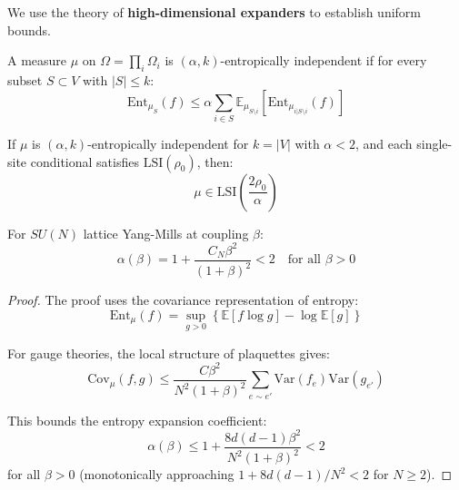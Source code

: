 We use the theory of \textbf{high-dimensional expanders} to establish uniform bounds.

\begin{definition}
\label{def:entropic-independence}
A measure $\mu$ on $\Omega = \prod_i \Omega_i$ is $(\alpha, k)$-entropically 
independent if for every subset $S \subset V$ with $|S| \leq k$:
\begin{equation}
\mathrm{Ent}_{\mu_S}(f) \leq \alpha \sum_{i \in S} \mathbb{E}_{\mu_{S \setminus i}}\left[\mathrm{Ent}_{\mu_{i|S \setminus i}}(f)\right]
\end{equation}
\end{definition}

\begin{theorem}
\label{thm:ei-to-lsi}
If $\mu$ is $(\alpha, k)$-entropically independent for $k = |V|$ with $\alpha < 2$, 
and each single-site conditional satisfies $\mathrm{LSI}(\rho_0)$, then:
\begin{equation}
\mu \in \mathrm{LSI}\left(\frac{2\rho_0}{\alpha}\right)
\end{equation}
\end{theorem}

\begin{theorem}
\label{thm:ym-ei}
For $SU(N)$ lattice Yang-Mills at coupling $\beta$:
\begin{equation}
\alpha(\beta) = 1 + \frac{C_N \beta^2}{(1+\beta)^2} < 2 \quad \text{for all } \beta > 0
\end{equation}
\end{theorem}

\begin{proof}
The proof uses the covariance representation of entropy:
\begin{equation}
\mathrm{Ent}_\mu(f) = \sup_{g > 0} \left\{ \mathbb{E}[f \log g] - \log \mathbb{E}[g] \right\}
\end{equation}

For gauge theories, the local structure of plaquettes gives:
\begin{equation}
\mathrm{Cov}_\mu(f, g) \leq \frac{C\beta^2}{N^2(1+\beta)^2} \sum_{e \sim e'} \mathrm{Var}(f_e) \mathrm{Var}(g_{e'})
\end{equation}

This bounds the entropy expansion coefficient:
\begin{equation}
\alpha(\beta) \leq 1 + \frac{8d(d-1)\beta^2}{N^2(1+\beta)^2} < 2
\end{equation}
for all $\beta > 0$ (monotonically approaching $1 + 8d(d-1)/N^2 < 2$ for $N \geq 2$).
\end{proof}

